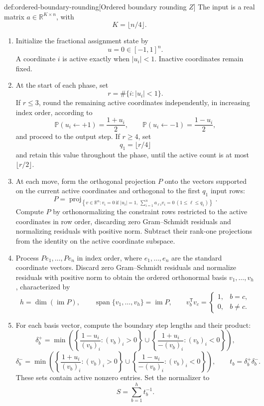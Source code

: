 \documentclass[11pt]{article}
\begin{document}
\begin{algorithmv}{def:ordered-boundary-rounding}[Ordered boundary rounding $Z$]
The input is a real matrix \(a\in\mathbb R^{K\times n}\), with
\[
K=\lfloor n/4\rfloor.
\]
\begin{enumerate}
\item Initialize the fractional assignment state by
\[
u=0\in[-1,1]^n.
\]
A coordinate \(i\) is active exactly when \(|u_i|<1\). Inactive coordinates remain fixed.

\item At the start of each phase, set
\[
r=\#\{i:|u_i|<1\}.
\]
If \(r\leq3\), round the remaining active coordinates independently, in increasing index order, according to
\[
\mathbb P(u_i\leftarrow+1)=\frac{1+u_i}{2},
\qquad
\mathbb P(u_i\leftarrow-1)=\frac{1-u_i}{2},
\]
and proceed to the output step. If \(r\geq4\), set
\[
q_1=\lfloor r/4\rfloor
\]
and retain this value throughout the phase, until the active count is at most \(\lfloor r/2\rfloor\).

\item At each move, form the orthogonal projection \(P\) onto the vectors supported on the current active coordinates and orthogonal to the first \(q_1\) input rows:
\[
P=
\operatorname{proj}_{\left\{
v\in\mathbb R^n:
v_i=0\ \text{if }|u_i|=1,\ 
\sum_{i=1}^n a_{\ell i}v_i=0\ (1\leq\ell\leq q_1)
\right\}}.
\]
Compute \(P\) by orthonormalizing the constraint rows restricted to the active coordinates in row order, discarding zero Gram--Schmidt residuals and normalizing residuals with positive norm. Subtract their rank-one projections from the identity on the active coordinate subspace.

\item Process \(Pe_1,\ldots,Pe_n\) in index order, where \(e_1,\ldots,e_n\) are the standard coordinate vectors. Discard zero Gram--Schmidt residuals and normalize residuals with positive norm to obtain the ordered orthonormal basis \(v_1,\ldots,v_h\), characterized by
\[
h=\dim(\operatorname{im}P),
\qquad
\operatorname{span}\{v_1,\ldots,v_h\}=\operatorname{im}P,
\qquad
v_b^{\mathsf T}v_c=
\begin{cases}
1,&b=c,\\
0,&b\ne c.
\end{cases}
\]

\item For each basis vector, compute the boundary step lengths and their product:
\[
\delta_b^+
=
\min\left(
\left\{\frac{1-u_i}{(v_b)_i}:(v_b)_i>0\right\}
\cup
\left\{\frac{1+u_i}{-(v_b)_i}:(v_b)_i<0\right\}
\right),
\]
\[
\delta_b^-
=
\min\left(
\left\{\frac{1+u_i}{(v_b)_i}:(v_b)_i>0\right\}
\cup
\left\{\frac{1-u_i}{-(v_b)_i}:(v_b)_i<0\right\}
\right),
\qquad
t_b=\delta_b^+\delta_b^-.
\]
These sets contain active nonzero entries. Set the normalizer to
\[
S=\sum_{b=1}^h t_b^{-1}.
\]


\end{enumerate}
\end{algorithmv}
\end{document}
